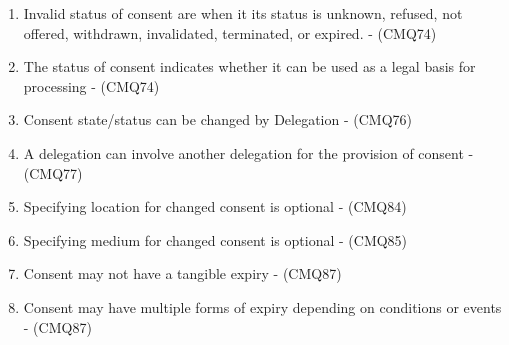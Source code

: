 \begin{enumerate}[label={\textit{A.\theenumi}}]
    \item Invalid status of consent are when it its status is unknown, refused, not offered, withdrawn, invalidated, terminated, or expired. - (CMQ74)
    \item The status of consent indicates whether it can be used as a legal basis for processing - (CMQ74)
    \item Consent state/status can be changed by Delegation - (CMQ76)
    \item A delegation can involve another delegation for the provision of consent - (CMQ77)
    \item Specifying location for changed consent is optional - (CMQ84)
    \item Specifying medium for changed consent is optional - (CMQ85)
    \item Consent may not have a tangible expiry - (CMQ87)
    \item Consent may have multiple forms of expiry depending on conditions or events - (CMQ87)
\end{enumerate}

